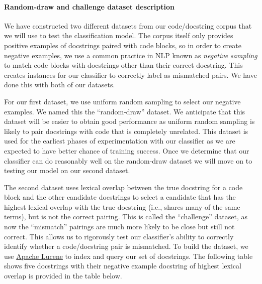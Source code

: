 \documentclass[article, 12pt, oneside]{memoir}
\begin{document}
\hypertarget{random-draw-and-challenge-dataset-description}{%
\paragraph{Random-draw and challenge dataset
description}\label{random-draw-and-challenge-dataset-description}}

We have constructed two different datasets from our code/docstring
corpus that we will use to test the classification model. The corpus
itself only provides positive examples of docstrings paired with code
blocks, so in order to create negative examples, we use a common
practice in NLP known as \emph{negative sampling} to match code blocks
with docstrings other than their correct docstring. This creates
instances for our classifier to correctly label as mismatched pairs. We
have done this with both of our datasets.

For our first dataset, we use uniform random sampling to select our
negative examples. We named this the ``random-draw'' dataset. We
anticipate that this dataset will be easier to obtain good performance
as uniform random sampling is likely to pair docstrings with code that
is completely unrelated. This dataset is used for the earliest phases of
experimentation with our classifier as we are expected to have better
chance of training success. Once we determine that our classifier can do
reasonably well on the random-draw dataset we will move on to testing
our model on our second dataset.

The second dataset uses lexical overlap between the true docstring for a
code block and the other candidate docstrings to select a candidate that
has the highest lexical overlap with the true docstring (i.e., shares
many of the same terms), but is not the correct pairing. This is called
the ``challenge'' dataset, as now the ``mismatch'' pairings are much
more likely to be close but still not correct. This allows us to
rigorously test our classifier's ability to correctly identify whether a
code/docstring pair is mismatched. To build the dataset, we use
\href{http://lucene.apache.org/}{Apache Lucene} to index and query our
set of docstrings. The following table shows five docstrings with their
negative example docstring of highest lexical overlap is provided in the
table below.
\end{document}
